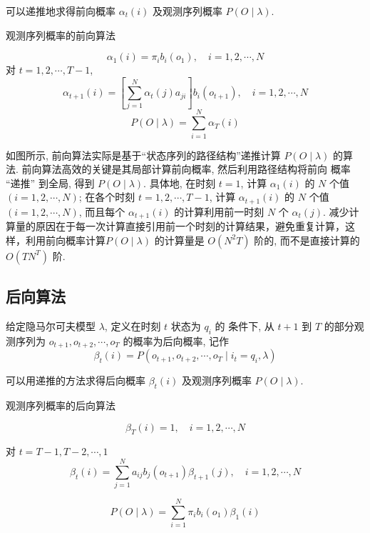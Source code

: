 可以递推地求得前向概率 $ \alpha_{t}(i) $ 及观测序列概率 $ P(O \mid \lambda) $.

\begin{algorithm}[htbp]
    \caption{观测序列概率的前向算法}


    $$ \alpha_{1}(i)=\pi_{i} b_{i}\left(o_{1}\right), \quad i=1,2, \cdots, N $$\;
    对 $ t=1,2, \cdots, T-1 $,
$$
\alpha_{t+1}(i)=\left[\sum_{j=1}^{N} \alpha_{t}(j) a_{j i}\right] b_{i}\left(o_{t+1}\right), \quad i=1,2, \cdots, N
$$\;
$$ P(O \mid \lambda)=\sum_{i=1}^{N} \alpha_{T}(i) $$\;
\end{algorithm}

如图所示, 前向算法实际是基于“状态序列的路径结构”递推计算 $ P(O \mid \lambda) $ 的算法. 前向算法高效的关键是其局部计算前向概率, 然后利用路径结构将前向 概率 “递推” 到全局, 得到 $ P(O \mid \lambda) $. 具体地, 在时刻 $ t=1 $, 计算 $ \alpha_{1}(i) $ 的 $ N $ 个值$ (i=1,2, \cdots, N) $; 在各个时刻 $ t=1,2, \cdots, T-1 $, 计算 $ \alpha_{t+1}(i) $ 的 $ N $ 个值 $ (i=1,2, \cdots, N) $, 而且每个 $ \alpha_{t+1}(i) $ 的计算利用前一时刻 $ N $ 个 $ \alpha_{t}(j) $. 减少计算量的原因在于每一次计算直接引用前一个时刻的计算结果，避免重复计算，这样，利用前向概率计算$ P(O \mid \lambda) $ 的计算量是 $ O\left(N^{2} T\right) $ 阶的, 而不是直接计算的 $ O\left(T N^{T}\right) $ 阶.

\subsection{后向算法}

\begin{definition}[后向概率]
    给定隐马尔可夫模型 $\lambda$, 定义在时刻 $t$ 状态为 $q_{i}$ 的 条件下, 从 $t+1$ 到 $T$ 的部分观测序列为 $o_{t+1}, o_{t+2}, \cdots, o_{T}$ 的概率为后向概率, 记作
$$
\beta_{t}(i)=P\left(o_{t+1}, o_{t+2}, \cdots, o_{T} \mid i_{t}=q_{i}, \lambda\right)
$$

\end{definition}

可以用递推的方法求得后向概率 $\beta_{t}(i)$ 及观测序列概率 $P(O \mid \lambda)$.

\begin{algorithm}[htbp]
    \caption{观测序列概率的后向算法}

    $$ \beta_{T}(i)=1, \quad i=1,2, \cdots, N $$\;

    对   $ t=T-1, T-2, \cdots, 1 $
    $$ \beta_{t}(i)=\sum_{j=1}^{N} a_{i j} b_{j}\left(o_{t+1}\right) \beta_{t+1}(j), \quad i=1,2, \cdots, N $$\;

    $$ P(O \mid \lambda)=\sum_{i=1}^{N} \pi_{i} b_{i}\left(o_{1}\right) \beta_{1}(i) $$\;
\end{algorithm}

